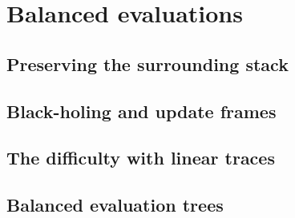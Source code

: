 \chapter{Balanced evaluations}
\label{chap:balance}

\section{Preserving the surrounding stack}

\section{Black-holing and update frames}

\section{The difficulty with linear traces}

\section{Balanced evaluation trees}

